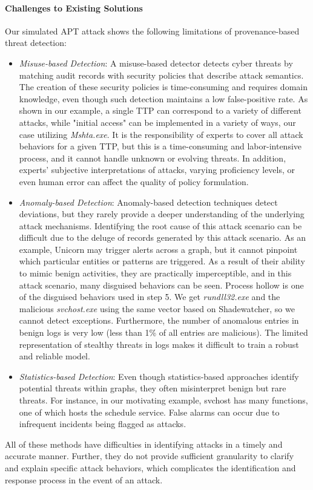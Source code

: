 \paragraph{Challenges to Existing Solutions}
Our simulated APT attack shows the following limitations of provenance-based threat detection:
\begin{itemize}[leftmargin=*]
    \item \textit{Misuse-based Detection}:  A misuse-based detector\cite{milajerdi2019holmes,milajerdi2019poirot} detects cyber threats by matching audit records with security policies that describe attack semantics. The creation of these security policies is time-consuming and requires domain knowledge, even though such detection maintains a low false-positive rate. As shown in our example, a single TTP can correspond to a variety of different attacks, while "initial access" can be implemented in a variety of ways, our case utilizing \textit{Mshta.exe}. It is the responsibility of experts to cover all attack behaviors for a given TTP, but this is a time-consuming and labor-intensive process, and it cannot handle unknown or evolving threats. In addition, experts' subjective interpretations of attacks, varying proficiency levels, or even human error can affect the quality of policy formulation.
    \item \textit{Anomaly-based Detection}: Anomaly-based detection techniques detect deviations, but they rarely provide a deeper understanding of the underlying attack mechanisms. Identifying the root cause of this attack scenario can be difficult due to the deluge of records generated by this attack scenario. As an example, Unicorn\cite{han2020unicorn} may trigger alerts across a graph, but it cannot pinpoint which particular entities or patterns are triggered. As a result of their ability to mimic benign activities, they are practically imperceptible, and in this attack scenario, many disguised behaviors can be seen. Process hollow is one of the disguised behaviors used in step 5. We get \textit{rundll32.exe} and the malicious \textit{svchost.exe} using the same vector based on Shadewatcher\cite{zengy2022shadewatcher}, so we cannot detect exceptions. Furthermore, the number of anomalous entries in benign logs is very low (less than 1\% of all entries are malicious). The limited representation of stealthy threats in logs makes it difficult to train a robust and reliable model.
    \item \textit{Statistics-based Detection}: Even though statistics-based approaches \cite{liu2018towards,hassan2019nodoze,hassan2020we} identify potential threats within graphs, they often misinterpret benign but rare threats. For instance, in our motivating example, svchost has many functions, one of which hosts the schedule service. False alarms can occur due to infrequent incidents being flagged as attacks.
\end{itemize}
All of these methods have difficulties in identifying attacks in a timely and accurate manner. Further, they do not provide sufficient granularity to clarify and explain specific attack behaviors, which complicates the identification and response process in the event of an attack.



